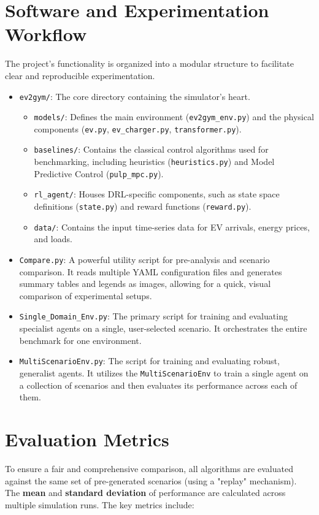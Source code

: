 \section{Software and Experimentation Workflow}
The project's functionality is organized into a modular structure to facilitate clear and reproducible experimentation.
\begin{itemize}
    \item \texttt{ev2gym/}: The core directory containing the simulator's heart.
    \begin{itemize}
        \item \texttt{models/}: Defines the main environment (\texttt{ev2gym\_env.py}) and the physical components (\texttt{ev.py}, \texttt{ev\_charger.py}, \texttt{transformer.py}).
        \item \texttt{baselines/}: Contains the classical control algorithms used for benchmarking, including heuristics (\texttt{heuristics.py}) and Model Predictive Control (\texttt{pulp\_mpc.py}).
        \item \texttt{rl\_agent/}: Houses DRL-specific components, such as state space definitions (\texttt{state.py}) and reward functions (\texttt{reward.py}).
        \item \texttt{data/}: Contains the input time-series data for EV arrivals, energy prices, and loads.
    \end{itemize}
    \item \texttt{Compare.py}: A powerful utility script for pre-analysis and scenario comparison. It reads multiple YAML configuration files and generates summary tables and legends as images, allowing for a quick, visual comparison of experimental setups.
    \item \texttt{Single\_Domain\_Env.py}: The primary script for training and evaluating specialist agents on a single, user-selected scenario. It orchestrates the entire benchmark for one environment.
    \item \texttt{MultiScenarioEnv.py}: The script for training and evaluating robust, generalist agents. It utilizes the \texttt{MultiScenarioEnv} to train a single agent on a collection of scenarios and then evaluates its performance across each of them.
\end{itemize}

\section{Evaluation Metrics}
To ensure a fair and comprehensive comparison, all algorithms are evaluated against the same set of pre-generated scenarios (using a "replay" mechanism). The \textbf{mean} and \textbf{standard deviation} of performance are calculated across multiple simulation runs. The key metrics include:

